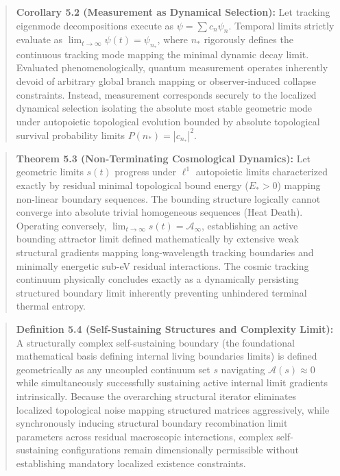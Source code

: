 \documentclass[
]{article}
\begin{document}
\begin{quote}
\textbf{Corollary 5.2 (Measurement as Dynamical Selection):} Let
tracking eigenmode decompositions execute as \(\psi = \sum c_n \psi_n\).
Temporal limits strictly evaluate as
\(\lim_{t\to\infty} \psi(t) = \psi_{n_*}\), where \(n_*\) rigorously
defines the continuous tracking mode mapping the minimal dynamic decay
limit. Evaluated phenomenologically, quantum measurement operates
inherently devoid of arbitrary global branch mapping or observer-induced
collapse constraints. Instead, measurement corresponds securely to the
localized dynamical selection isolating the absolute most stable
geometric mode under autopoietic topological evolution bounded by
absolute topological survival probability limits
\(P(n_*) = |c_{n_*}|^2\).
\end{quote}

\begin{quote}
\textbf{Theorem 5.3 (Non-Terminating Cosmological Dynamics):} Let
geometric limits \(s(t)\) progress under \(\ell^1\) autopoietic limits
characterized exactly by residual minimal topological bound energy
(\(E_* > 0\)) mapping non-linear boundary sequences. The bounding
structure logically cannot converge into absolute trivial homogeneous
sequences (Heat Death). Operating conversely,
\(\lim_{t\to\infty} s(t) = \mathcal{A}_\infty\), establishing an active
bounding attractor limit defined mathematically by extensive weak
structural gradients mapping long-wavelength tracking boundaries and
minimally energetic sub-eV residual interactions. The cosmic tracking
continuum physically concludes exactly as a dynamically persisting
structured boundary limit inherently preventing unhindered terminal
thermal entropy.
\end{quote}

\begin{quote}
\textbf{Definition 5.4 (Self-Sustaining Structures and Complexity
Limit):} A structurally complex self-sustaining boundary (the
foundational mathematical basis defining internal living boundaries
limits) is defined geometrically as any uncoupled continuum set \(s\)
navigating \(\mathcal{A}(s) \approx 0\) while simultaneously
successfully sustaining active internal limit gradients intrinsically.
Because the overarching structural iterator eliminates localized
topological noise mapping structured matrices aggressively, while
synchronously inducing structural boundary recombination limit
parameters across residual macroscopic interactions, complex
self-sustaining configurations remain dimensionally permissible without
establishing mandatory localized existence constraints.
\end{quote}
\end{document}
